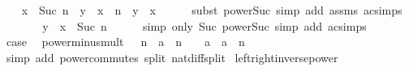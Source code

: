 \begin{isabellebody}
\ \ \isamarkupfalse%
\ {\isachardoublequoteopen}x\ {\isacharcircum}{\kern0pt}\ Suc\ n\ {\isacharasterisk}{\kern0pt}\ y\ {\isacharequal}{\kern0pt}\ x\ {\isacharcircum}{\kern0pt}\ n\ {\isacharasterisk}{\kern0pt}\ y\ {\isacharasterisk}{\kern0pt}\ x{\isachardoublequoteclose}\isanewline
\ \ \ \ \isamarkupfalse%
\ {\isacharparenleft}{\kern0pt}subst\ power{\isacharunderscore}{\kern0pt}Suc{}{\isacharparenright}{\kern0pt}\ {\isacharparenleft}{\kern0pt}simp\ add{\isacharcolon}{\kern0pt}\ assms\ ac{\isacharunderscore}{\kern0pt}simps{\isacharparenright}{\kern0pt}\isanewline
\ \ \isamarkupfalse%
\ \isamarkupfalse%
\ {\isachardoublequoteopen}{\isasymdots}\ {\isacharequal}{\kern0pt}\ y\ {\isacharasterisk}{\kern0pt}\ x\ {\isacharcircum}{\kern0pt}\ Suc\ n{\isachardoublequoteclose}\isanewline
\ \ \ \ \isamarkupfalse%
\ {\isacharparenleft}{\kern0pt}simp\ only{\isacharcolon}{\kern0pt}\ Suc\ power{\isacharunderscore}{\kern0pt}Suc{}{\isacharparenright}{\kern0pt}\ {\isacharparenleft}{\kern0pt}simp\ add{\isacharcolon}{\kern0pt}\ ac{\isacharunderscore}{\kern0pt}simps{\isacharparenright}{\kern0pt}\isanewline
\ \ \isamarkupfalse%
\ \isamarkupfalse%
\ {\isacharquery}{\kern0pt}case\ \isacommand{{\isachardot}{\kern0pt}}\isamarkupfalse%
\isanewline
{}\isamarkupfalse%
%
\endisatagproof
{\isafoldproof}%
%
\isadelimproof
\isanewline
%
\endisadelimproof
\isanewline
{}\isamarkupfalse%
\ power{\isacharunderscore}{\kern0pt}minus{\isacharunderscore}{\kern0pt}mult{\isacharcolon}{\kern0pt}\ {\isachardoublequoteopen}{}\ {\isacharless}{\kern0pt}\ n\ {\isasymLongrightarrow}\ a\ {\isacharcircum}{\kern0pt}\ {\isacharparenleft}{\kern0pt}n\ {\isacharminus}{\kern0pt}\ {}{\isacharparenright}{\kern0pt}\ {\isacharasterisk}{\kern0pt}\ a\ {\isacharequal}{\kern0pt}\ a\ {\isacharcircum}{\kern0pt}\ n{\isachardoublequoteclose}\isanewline
%
\isadelimproof
\ \ %
\endisadelimproof
%
\isatagproof
{}\isamarkupfalse%
\ {\isacharparenleft}{\kern0pt}simp\ add{\isacharcolon}{\kern0pt}\ power{\isacharunderscore}{\kern0pt}commutes\ split{\isacharcolon}{\kern0pt}\ nat{\isacharunderscore}{\kern0pt}diff{\isacharunderscore}{\kern0pt}split{\isacharparenright}{\kern0pt}%
\endisatagproof
{\isafoldproof}%
%
\isadelimproof
\isanewline
%
\endisadelimproof
\isanewline
{}\isamarkupfalse%
\ left{\isacharunderscore}{\kern0pt}right{\isacharunderscore}{\kern0pt}inverse{\isacharunderscore}{\kern0pt}power{\isacharcolon}{\kern0pt}\isanewline

\end{isabellebody}
